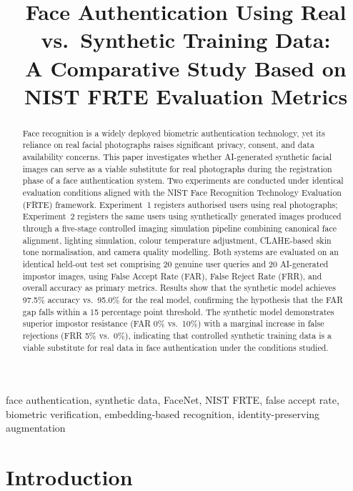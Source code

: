 \documentclass[conference]{IEEEtran}
\title{Face Authentication Using Real vs.\ Synthetic Training Data:\\
A Comparative Study Based on NIST FRTE Evaluation Metrics}
\author{
    \IEEEauthorblockN{Nour Ebid}
    \IEEEauthorblockA{
        Seminar zu aktuellen Entwicklungen\\
        M.Sc. Angewandte Informatik, Fachbereich 4\\
        Hochschule f{\"u}r Technik und Wirtschaft Berlin\\
        Berlin, Deutschland\\
        Nour.Ebid@Student.HTW-Berlin.de
    }
}
\begin{document}
\maketitle

\begin{abstract}
Face recognition is a widely deployed biometric authentication technology, yet its reliance on real facial photographs raises significant privacy, consent, and data availability concerns. This paper investigates whether AI-generated synthetic facial images can serve as a viable substitute for real photographs during the registration phase of a face authentication system. Two experiments are conducted under identical evaluation conditions aligned with the NIST Face Recognition Technology Evaluation (FRTE) framework. Experiment~1 registers authorised users using real photographs; Experiment~2 registers the same users using synthetically generated images produced through a five-stage controlled imaging simulation pipeline combining canonical face alignment, lighting simulation, colour temperature adjustment, CLAHE-based skin tone normalisation, and camera quality modelling. Both systems are evaluated on an identical held-out test set comprising 20 genuine user queries and 20 AI-generated impostor images, using False Accept Rate (FAR), False Reject Rate (FRR), and overall accuracy as primary metrics. Results show that the synthetic model achieves 97.5\% accuracy vs.\ 95.0\% for the real model, confirming the hypothesis that the FAR gap falls within a 15 percentage point threshold. The synthetic model demonstrates superior impostor resistance (FAR 0\% vs.\ 10\%) with a marginal increase in false rejections (FRR 5\% vs.\ 0\%), indicating that controlled synthetic training data is a viable substitute for real data in face authentication under the conditions studied.
\end{abstract}

\begin{IEEEkeywords}
face authentication, synthetic data, FaceNet, NIST FRTE, false accept rate, biometric verification, embedding-based recognition, identity-preserving augmentation
\end{IEEEkeywords}

\section{Introduction}
\end{document}
